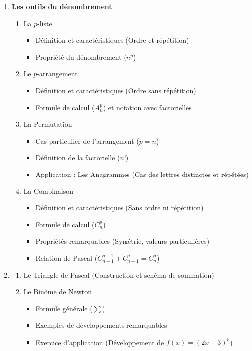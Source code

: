 \documentclass[12pt,a4paper]{article}
\begin{document}
\begin{enumerate}[label=\Roman*., font=\bfseries\color{red}]
    \item \textbf{Les outils du dénombrement}
    \begin{enumerate}
        \item La $p$-liste
        \begin{itemize}
            \item Définition et caractéristiques (Ordre et répétition)
            \item Propriété du dénombrement ($n^p$)
        \end{itemize}
        \item Le $p$-arrangement
        \begin{itemize}
            \item Définition et caractéristiques (Ordre sans répétition)
            \item Formule de calcul ($A_n^p$) et notation avec factorielles
        \end{itemize}
        \item La Permutation
        \begin{itemize}
            \item Cas particulier de l'arrangement ($p=n$)
            \item Définition de la factorielle ($n!$)
            \item Application : Les Anagrammes (Cas des lettres distinctes et répétées)
        \end{itemize}
        \item La Combinaison
        \begin{itemize}
            \item Définition et caractéristiques (Sans ordre ni répétition)
            \item Formule de calcul ($C_n^p$)
            \item Propriétés remarquables (Symétrie, valeurs particulières)
            \item Relation de Pascal ($C_{n-1}^{p-1} + C_{n-1}^p = C_n^p$)
        \end{itemize}
    \end{enumerate}

    \item \textbf{}
    \begin{enumerate}
        \item Le Triangle de Pascal (Construction et schéma de sommation)
        \item Le Binôme de Newton
        \begin{itemize}
            \item Formule générale ($\sum$)
            \item Exemples de développements remarquables
            \item Exercice d'application (Développement de $f(x) = (2x+3)^5$)
        \end{itemize}
    \end{enumerate}


\end{enumerate}
\end{document}
